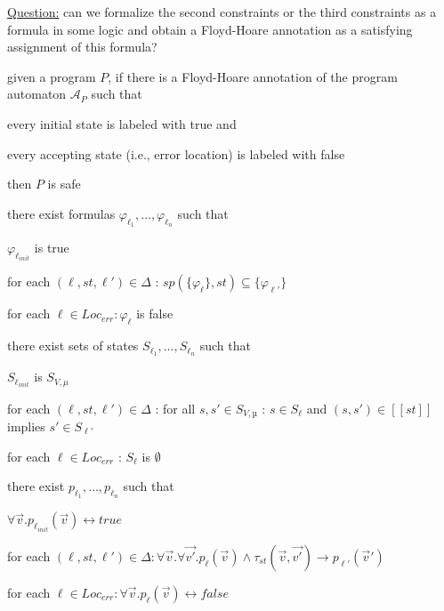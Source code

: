 \documentclass[landscape, a4paper]{article}
\begin{document}
\begin{minipage}[t]{0.2\linewidth}
\begin{betterlist}
		\item \underline{Question:} can we formalize the second constraints or the third constraints as a formula in some logic and obtain a Floyd-Hoare annotation as a satisfying assignment of this formula?
		\item \color{violet}given a program $P$, if there is a Floyd-Hoare annotation of the program automaton $\mathcal{A}_P$ such that
		\begin{betterlist}
			\item every initial state is labeled with true and
			\item every accepting state (i.e., error location) is labeled with false
		\end{betterlist}
		then $P$ is safe\color{black}
		\begin{betterlist}
			\item there exist formulas $\varphi_{\ell_1},\ldots , \varphi_{\ell_n}$ such that
			\begin{betterlist}
				\item $\varphi_{\ell_{init}}$ is true
				\item for each $(\ell , st, \ell ' ) \in \Delta$ : $sp(\{ \varphi_{\ell} \} , st) \subseteq \{ \varphi_{\ell'}\}$
				\item for each $\ell \in Loc_{err} : \varphi_{\ell}$ is false
			\end{betterlist}
			\item there exist sets of states $S_{\ell_1},\ldots , S_{\ell_n}$ such that
			\begin{betterlist}
				\item $S_{\ell_{init}}$ is $S_{V,\mu}$
				\item for each $(\ell, st, \ell') \in \Delta$ : for all $s, s' \in S_{V,µ}$ : $s \in S_{\ell}$ and $(s, s') \in [[st]]$ implies $s' \in S_{\ell'}$
				\item for each $\ell \in Loc_{err}$ : $S_{\ell}$ is $\emptyset$
			\end{betterlist}
			\item there exist $p_{\ell_1},\ldots , p_{\ell_n}$ such that
			\begin{betterlist}
				\item $\forall\vec{v}. p_{\ell_{init}}(\vec{v}) \leftrightarrow true$
				\item for each $(\ell, st, \ell') \in \Delta : \forall\vec{v}.\forall\vec{v'}.p_{\ell}(\vec{v}) \land \tau_{st}(\vec{v},\vec{v'}) \rightarrow p_{\ell'}(\vec{v}')$
				\item for each $\ell \in Loc_{err} : \forall\vec{v}. p_{\ell}(\vec{v}) \leftrightarrow false$

\end{betterlist}
\end{betterlist}
\end{betterlist}
\end{minipage}
\end{document}
